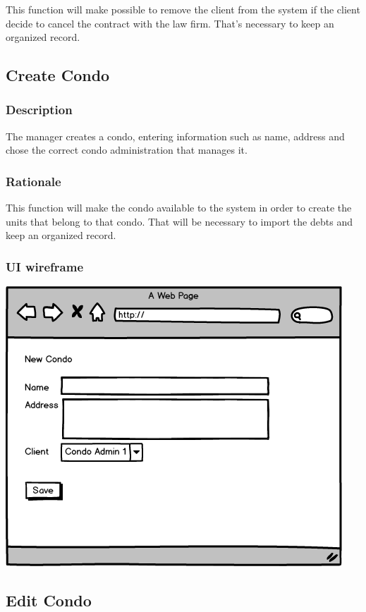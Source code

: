 \documentclass{scrreprt}
\begin{document}
This function will make possible to remove the client from the system if the client decide to cancel the contract with the law firm. That's necessary to keep an organized record.

\subsection{Create Condo}
\subsubsection{Description}

The manager creates a condo, entering information such as name, address and chose the correct condo administration that manages it.

\subsubsection{Rationale}

This function will make the condo available to the system in order to create the units that belong to that condo. That will be necessary to import the debts and keep an organized record.

\subsubsection{UI wireframe}
\includegraphics[scale=0.60]{mockups/createcondo.png}

\subsection{Edit Condo}
\end{document}
